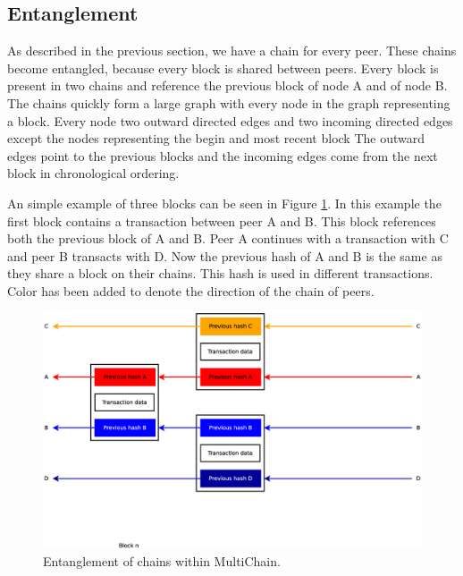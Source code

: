 \subsection{Entanglement}
As described in the previous section, we have a chain for every peer.
These chains become entangled, because every block is shared between peers.
Every block is present in two chains and reference the previous block of node A and of node B.
The chains quickly form a large graph with every node in the graph representing a block.
Every node two outward directed edges and two incoming directed edges
except the nodes representing the begin and most recent block
The outward edges point to the previous blocks
and the incoming edges come from the next block in chronological ordering.

An simple example of three blocks can be seen in Figure \ref{fig:chain-example}.
In this example the first block contains a transaction between peer A and B.
This block references both the previous block of A and B.
Peer A continues with a transaction with C and peer B transacts with D.
Now the previous hash of A and B is the same as they share a block on their chains.
This hash is used in different transactions.
Color has been added to denote the direction of the chain of peers.

\begin{figure}
	\centerline{\includegraphics[scale=0.3]{design/figs/entangled-chain.eps}}
	\caption{Entanglement of chains within MultiChain.}
	\label{fig:chain-example}
\end{figure}


